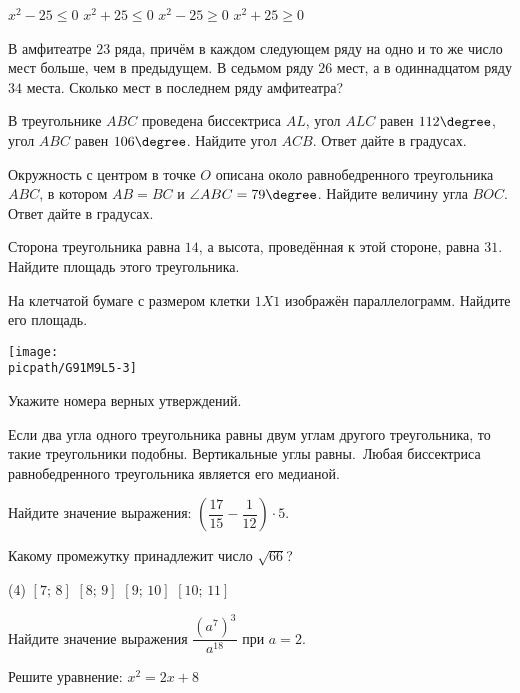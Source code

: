 \begin{class}[number=7]
\begin{listofex}
\begin{tasks}
			\task \( x^2-25\le0 \)
			\task \( x^2+25\le0 \)
			\task\( x^2-25\ge0 \)
			\task \( x^2+25\ge0 \)
		\end{tasks}
		\item В амфитеатре \( 23 \) ряда, причём в каждом следующем ряду на одно и то же число мест больше, чем в предыдущем. В седьмом ряду \( 26 \) мест,	а в одиннадцатом ряду \( 34 \) места. Сколько мест в последнем ряду амфитеатра?
		\item В треугольнике \( ABC \) проведена биссектриса \( AL \), угол \( ALC \) равен \( 112\degree \), угол \( ABC \) равен \( 106\degree \). Найдите угол \( ACB \). Ответ дайте в градусах.
		\item Окружность с центром в точке \( O \) описана около равнобедренного треугольника \( ABC \), в котором \( AB=BC \) и \( \angle ABC=79\degree \). Найдите величину угла \( BOC	 \). Ответ дайте в градусах.
		\item Сторона треугольника равна \( 14 \), а высота, проведённая к этой стороне, равна \( 31 \). Найдите площадь этого треугольника.
		\item
		\begin{minipage}[t]{\bodywidth}
			На клетчатой бумаге с размером клетки \( 1X1 \) изображён параллелограмм. Найдите его площадь.
		\end{minipage}
		\gapwidth
		\begin{minipage}[t]{\picwidth}
			\texttt{[image: \\picpath/G91M9L5-3]}
		\end{minipage}
		\item Укажите номера верных утверждений.
		\begin{tasks}
			\task Если два угла одного треугольника равны двум углам другого треугольника, то такие треугольники подобны.
			\task Вертикальные углы равны.
			\task Любая биссектриса равнобедренного треугольника является его медианой.
		\end{tasks}
		\item Найдите значение выражения: \(\left( \dfrac{ 17 }{ 15 }-\dfrac{ 1 }{ 12 }\right)\cdot5 \).
		\item Какому промежутку принадлежит число \(\sqrt{66}\)?
		\begin{tasks}(4)
			\task \( [7;\,8] \)
			\task \( [8;\,9] \)
			\task \( [9;\,10] \)
			\task \( [10;\,11] \)
		\end{tasks}
		\item Найдите значение выражения \( \dfrac{(a^7)^3}{a^{18}} \) при \( a=2 \).
		\item Решите уравнение: \( x^2=2x+8 \)

\end{listofex}
\end{class}
